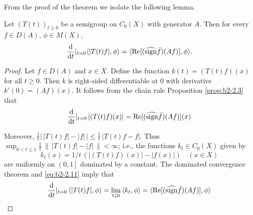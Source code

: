 From the proof of the theorem we isolate the following lemma.

\begin{lemma}\label{lem:b2-2.6}
Let $(T(t))_{t \geq 0}$ be a semigroup on $C_{0}(X)$ with generator $A$.
Then for every $f \in D(A)$, $\phi \in M(X)$,
\begin{equation}\label{eq:b2-2.10}
\frac{\mathrm{d}}{\mathop{}\!\mathrm{d}{t}}
|_{t = 0} \langle |T(t)f|,\phi \rangle = \langle \mathop{}\!\mathrm{Re}[(\widehat{\operatorname{sign}} \bar{f})(Af)],\phi \rangle.
\end{equation}
\end{lemma}

\begin{proof}
Let $f \in D(A)$ and $x \in X$.
Define the function $k(t) = (T(t)f)(x)$ for all $t \geq 0$.
Then $k$ is right-sided differentiable at $0$ with derivative $k'(0) = (Af)(x)$.
It follows from the chain rule Proposition \ref{prop:b2-2.3} that
\begin{equation}\label{eq:b2-2.11}
\frac{\mathop{}\!\mathrm{d}{}}{\mathop{}\!\mathrm{d}{t}}
|_{t = 0}\, |(T(t)f)(x)| = \mathop{}\!\mathrm{Re}[(\widehat{\operatorname{sign}} \bar{f})(Af)](x)
\end{equation}

Moreover, $\frac{1}{t} \left|\, |T(t)f| - |f| \, \right| \leq \frac{1}{t}\, |T(t)f - f|$.
Thus $\sup_{0 < t \leq 1} \frac{1}{t}\, \|\, |T(t)f| - |f|\, \| < \infty$; i.e., the functions $k_{t} \in C_{0}(X)$ given by
\begin{equation}\label{eq:b2-2.12}
k_{t}(x) = 1/t\,(|(T(t)f)(x)| - |f(x)|) \quad (x \in X)
\end{equation}
are uniformly on $\left(0,1\right]$ dominated by a constant.
The dominated convergence theorem and \eqref{eq:b2-2.11} imply that
\begin{align*}
\frac{\mathop{}\!\mathrm{d}{}}{\mathop{}\!\mathrm{d}{t}}|_{t=0}\, \langle |T(t)f|,\phi \rangle = \lim_{t \downarrow 0}\, \langle k_{t},\phi \rangle = \langle \mathop{}\!\mathrm{Re}[(\widehat{\operatorname{sign}} \bar{f})(Af)],\phi \rangle
\end{align*}
\end{proof}

